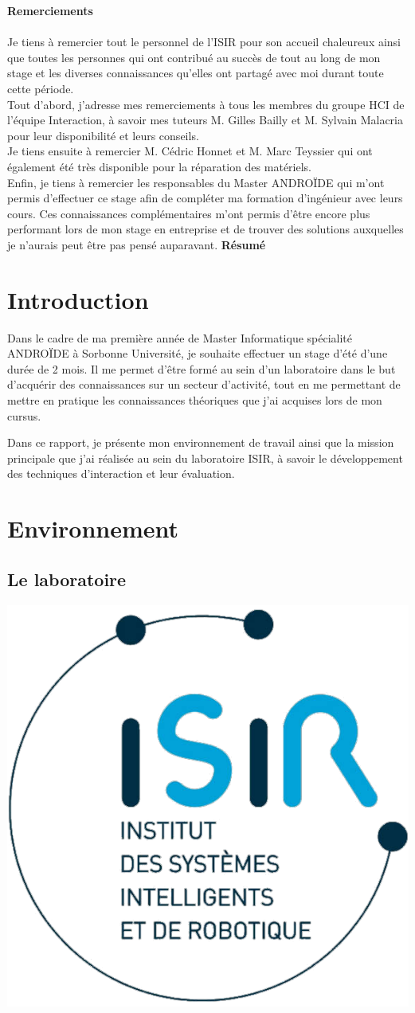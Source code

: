 \documentclass[12pt,a4paper]{article}
\begin{document}
{\huge \textbf{Remerciements}}\\
\vspace{0.5cm}\\
Je tiens à remercier tout le personnel de l'ISIR pour son accueil
chaleureux ainsi que toutes les personnes qui ont contribué au succès de tout au long de mon stage et les diverses connaissances qu'elles ont partagé avec moi durant toute cette période.
\vspace{0.5cm}\\
Tout d'abord, j'adresse mes remerciements à tous les membres du groupe HCI de l'équipe Interaction, à savoir mes tuteurs M. Gilles Bailly et M. Sylvain Malacria pour leur disponibilité et leurs conseils.
\vspace{0.5cm}\\
Je tiens ensuite à remercier M. Cédric Honnet et M. Marc Teyssier qui ont également été très disponible pour la réparation des matériels.
\vspace{0.5cm}\\
Enfin, je tiens à remercier les responsables du Master ANDROÏDE qui m'ont permis d'effectuer ce stage afin de compléter ma formation d'ingénieur avec leurs cours. Ces connaissances complémentaires m'ont permis d'être encore plus performant lors de mon stage en entreprise et de trouver des
solutions auxquelles je n'aurais peut être pas pensé auparavant.
\newpage
{\huge \textbf{Résumé}}\\
\newpage
\tableofcontents
\newpage
\section{Introduction}
Dans le cadre de ma première année de Master Informatique spécialité ANDROÏDE à Sorbonne Université, je souhaite effectuer un stage d'été d'une durée de 2 mois. Il me permet d'être formé au sein d'un laboratoire dans le but d'acquérir des connaissances sur un secteur d'activité, tout en me permettant de mettre en pratique les connaissances théoriques que j'ai acquises lors de mon cursus.

Dans ce rapport, je présente mon environnement de travail ainsi que la mission principale que j'ai réalisée au sein du laboratoire ISIR, à savoir le développement des techniques d'interaction et leur évaluation.
\section{Environnement}
\subsection{Le laboratoire}
\begin{center}
	\includegraphics[width=.3\linewidth]{ISIR.png}
\end{center}
\end{document}
